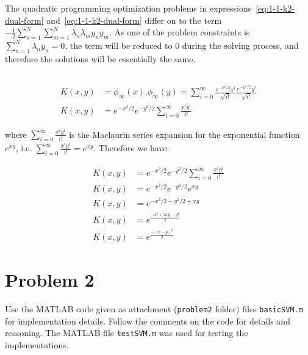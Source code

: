 \documentclass[paper=a4, fontsize=11pt]{scrartcl} %
\numberwithin{equation}{section} %
\numberwithin{figure}{section} %
\numberwithin{table}{section} %
\newcommand{\vertbreak}{\vspace{1.75 mm}}
\begin{document}
The quadratic programming optimization problems in 
expressions~\ref{eq:1-1-k2-dual-form} and~\ref{eq:1-1-k2-dual-form} differ on 
to the term $- \frac{1}{2}\sum_{n=1}^{N}\sum_{m=1}^{N}\lambda_n\lambda_{m}y_{n}y_{m}$. 
As one of the problem constraints is $\sum_{n=1}^{N}\lambda_{n}y_{n} = 0$, the 
term will be reduced to 0 during the solving process, and therefore the 
solutions will be essentially the same.

\subsection{}
\label{subsec:1-2}

\begin{equation*}
\begin{split}
    K(x,y) &= \phi_{\infty}(x).\phi_{\infty}(y) = \sum_{i=0}^{\infty}\frac{e^{-x^2/2}x^i}{\sqrt{i!}}\frac{e^{-y^2/2}y^i}{\sqrt{i!}}\\
    K(x,y) &= e^{-x^2/2}e^{-y^2/2}\sum_{i=0}^{\infty}\frac{x^iy^i}{i!}
    \label{eq:3-1-non-regular-normal}
\end{split}
\end{equation*}

where $\sum_{i=0}^{\infty}\frac{x^iy^i}{i!}$ is the Maclaurin series expansion for 
the exponential function~\cite{Abramowitz2012} $e^{xy}$, i.e. $\sum_{i=0}^{\infty}\frac{x^iy^i}{i!} = e^{xy}$. 
Therefore we have:

\begin{equation*}
\begin{split}
    K(x,y) &= e^{-x^2/2}e^{-y^2/2}\sum_{i=0}^{\infty}\frac{x^iy^i}{i!}\\
    K(x,y) &= e^{-x^2/2}e^{-y^2/2}e^{xy}\\
    K(x,y) &= e^{-x^2/2 - y^2/2 + xy}\\
    K(x,y) &= e^{\frac{-x^2 + 2xy - y^2}{2}}\\
    K(x,y) &= e^{\frac{-(x-y)^2}{2}}
    \label{eq:3-1-non-regular-normal}
\end{split}
\end{equation*}

\section{Problem 2}

Use the MATLAB code given as attachment (\verb+problem2+ folder) files 
\verb+basicSVM.m+ for implementation details. Follow the comments on the code 
for details and reasoning. The MATLAB file \verb+testSVM.m+ was used for 
testing the implementations.\vertbreak
\end{document}
